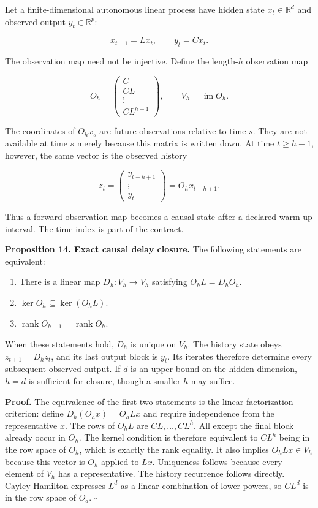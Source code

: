 \documentclass[11pt,letterpaper]{article}
\providecommand{\tightlist}{\setlength{\itemsep}{0pt}\setlength{\parskip}{0pt}}
\begin{document}
Let a finite-dimensional autonomous linear process have hidden state
\(x_t\in\mathbb R^d\) and observed output \(y_t\in\mathbb R^p\):

\[
x_{t+1}=Lx_t,\qquad y_t=Cx_t.
\]

The observation map need not be injective. Define the length-\(h\)
observation map

\[
O_h=\begin{pmatrix}C\\CL\\\vdots\\CL^{h-1}\end{pmatrix},
\qquad V_h=\operatorname{im}O_h.
\]

The coordinates of \(O_hx_s\) are future observations relative to time
\(s\). They are not available at time \(s\) merely because this matrix
is written down. At time \(t\geq h-1\), however, the same vector is the
observed history

\[
z_t=\begin{pmatrix}y_{t-h+1}\\\vdots\\y_t\end{pmatrix}
=O_hx_{t-h+1}.
\]

Thus a forward observation map becomes a causal state after a declared
warm-up interval. The time index is part of the contract.

\textbf{Proposition 14. Exact causal delay closure.} The following
statements are equivalent:

\begin{enumerate}
\def\labelenumi{\arabic{enumi}.}
\tightlist
\item
  There is a linear map \(D_h:V_h\to V_h\) satisfying \(O_hL=D_hO_h\).
\item
  \(\ker O_h\subseteq\ker(O_hL)\).
\item
  \(\operatorname{rank}O_{h+1}=\operatorname{rank}O_h\).
\end{enumerate}

When these statements hold, \(D_h\) is unique on \(V_h\). The history
state obeys \(z_{t+1}=D_hz_t\), and its last output block is \(y_t\).
Its iterates therefore determine every subsequent observed output. If
\(d\) is an upper bound on the hidden dimension, \(h=d\) is sufficient
for closure, though a smaller \(h\) may suffice.

\textbf{Proof.} The equivalence of the first two statements is the
linear factorization criterion: define \(D_h(O_hx)=O_hLx\) and require
independence from the representative \(x\). The rows of \(O_hL\) are
\(CL,\ldots,CL^h\). All except the final block already occur in \(O_h\).
The kernel condition is therefore equivalent to \(CL^h\) being in the
row space of \(O_h\), which is exactly the rank equality. It also
implies \(O_hLx\in V_h\) because this vector is \(O_h\) applied to
\(Lx\). Uniqueness follows because every element of \(V_h\) has a
representative. The history recurrence follows directly. Cayley-Hamilton
expresses \(L^d\) as a linear combination of lower powers, so \(CL^d\)
is in the row space of \(O_d\). \(\square\)
\end{document}
